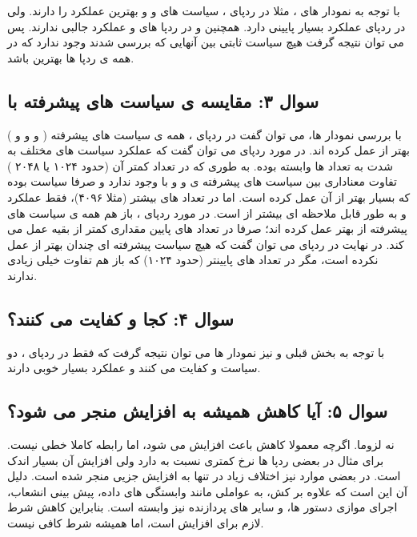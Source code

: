 \documentclass[12pt,a4paper]{article}
\begin{document}
با توجه به نمودار های ، مثلا در ردپای ، سیاست های  و  و  بهترین عملکرد را دارند. ولی  در ردپای  عملکرد بسیار پایینی دارد. همچنین  و  در ردپا های  و  عملکرد جالبی ندارند. پس می توان نتیجه گرفت هیچ سیاست ثابتی بین آنهایی که بررسی شدند وجود ندارد که در همه ی ردپا ها بهترین باشد.

\subsection{سوال ۳: مقایسه ی سیاست های پیشرفته با }

با بررسی نمودار ها، می توان گفت در ردپای ، همه ی سیاست های پیشرفته ( و  و  و ) بهتر از  عمل کرده اند. در مورد ردپای  می توان گفت که عملکرد سیاست های مختلف به شدت به تعداد  ها وابسته بوده. به طوری که در تعداد کمتر آن (حدود ۱۰۲۴ یا ۲۰۴۸ ) تفاوت معناداری بین سیاست های پیشرفته ی  و  و  با  وجود ندارد و صرفا سیاست  بوده که بسیار بهتر از آن عمل کرده است. اما در تعداد  های بیشتر (مثلا ۴۰۹۶)، فقط عملکرد  و  به طور قابل ملاحظه ای بیشتر از  است. در مورد ردپای ، باز هم همه ی سیاست های پیشرفته از  بهتر عمل کرده اند؛ صرفا  در تعداد  های پایین مقداری کمتر از بقیه عمل می کند. در نهایت در ردپای  می توان گفت که هیچ سیاست پیشرفته ای چندان بهتر از  عمل نکرده است، مگر در تعداد  های پایینتر (حدود ۱۰۲۴) که باز هم تفاوت خیلی زیادی ندارند.

\subsection{سوال ۴: کجا  و  کفایت می کنند؟}

با توجه به بخش قبلی و نیز نمودار ها می توان نتیجه گرفت که فقط در ردپای ، دو سیاست  و  کفایت می کنند و عملکرد بسیار خوبی دارند.

\subsection{سوال ۵: آیا کاهش  همیشه به افزایش  منجر می شود؟}

نه لزوما. اگرچه معمولا کاهش  باعث افزایش  می شود، اما رابطه کاملا خطی نیست. برای مثال  در بعضی ردپا ها نرخ  کمتری نسبت به  دارد ولی افزایش  آن بسیار اندک است. در بعضی موارد نیز اختلاف زیاد در  تنها به افزایش جزیی  منجر شده است. دلیل آن این است که  علاوه بر کش، به عواملی مانند وابستگی های داده، پیش بینی انشعاب، اجرای موازی دستور ها، و سایر  های پردازنده نیز وابسته است. بنابراین کاهش  شرط لازم برای افزایش  است، اما همیشه شرط کافی نیست.
\end{document}
